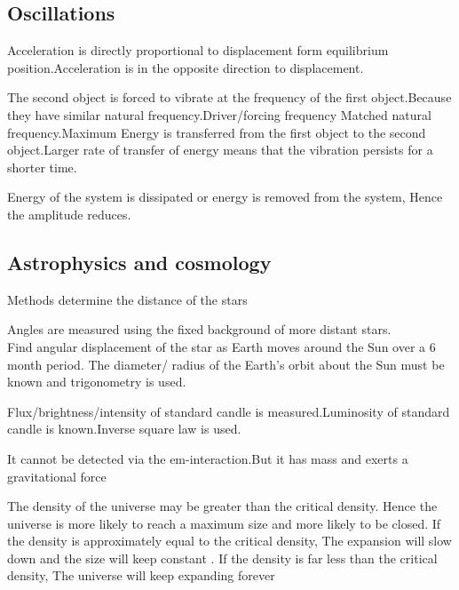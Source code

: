 \documentclass[a4paper]{article}
\begin{document}
\subsection{Oscillations}
\begin{defi}
Acceleration is directly proportional to displacement form equilibrium position.Acceleration is in the opposite direction to displacement.
\end{defi}
\begin{defi}[Resonance]
The second object is forced to vibrate at the frequency of the first object.Because they have similar natural frequency.Driver/forcing frequency Matched natural frequency.Maximum Energy is transferred from the first object to the second object.Larger rate of transfer of energy means that the vibration persists for a shorter time.
\end{defi}

\begin{defi}[Damping]
Energy of the system is dissipated or energy is removed from the system, Hence the amplitude reduces.
\end{defi}

\subsection{Astrophysics and cosmology}
Methods determine the distance of the stars
\begin{defi}
Angles are measured using the fixed background of more distant stars.\\
Find angular displacement of the star as Earth moves around the Sun over a 6 month period. The diameter/ radius of the Earth's orbit about the Sun must be known and trigonometry is used.
\end{defi}

\begin{defi}
Flux/brightness/intensity of standard candle is measured.Luminosity of standard candle is known.Inverse square law is used.
\end{defi}

\begin{defi}
It cannot be detected via the em-interaction.But it has mass and exerts a gravitational force
\end{defi}

\begin{defi}
The density of the universe may be greater than the critical density. Hence the universe is more likely to reach a maximum size and more likely to be closed. If the density is approximately equal to the critical density, The expansion will slow down and the size will keep constant . If the density is far less than the critical density, The universe will keep expanding forever
\end{defi}
\end{document}
